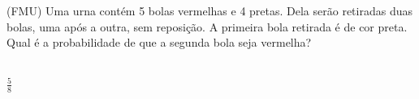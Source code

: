 \begin{ex}
 (FMU) Uma urna contém 5 bolas vermelhas e 4 pretas. Dela serão retiradas duas bolas, uma após a outra, sem reposição. A primeira bola retirada é de cor preta. Qual é a probabilidade de que a segunda bola seja vermelha?
   \begin{sol}
    \phantom{A} \\
    $\frac{5}{8}$
   \end{sol}
\end{ex}
